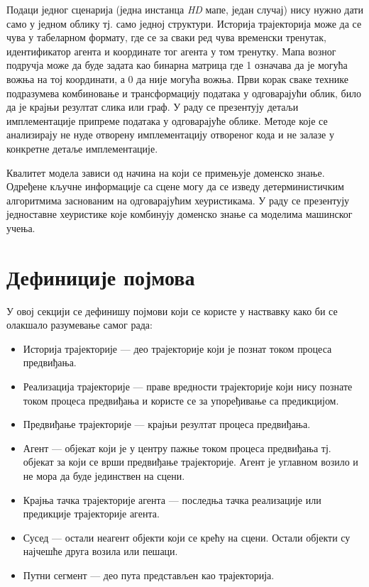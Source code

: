 \documentclass[11pt,oneside]{memoir}
\begin{document}
Подаци једног сценарија (једна инстанца \textit{HD} мапе, један случај) нису нужно дати само у једном облику 
тј. само једној структури. Историја
трајекторија може да се чува у табеларном формату, где се за сваки ред чува временски тренутак, идентификатор агента и координате
тог агента у том тренутку. Мапа возног подручја може да буде задата као бинарна матрица где 1 означава да је могућа вожња на тој координати, 
а 0 да није могућа вожња. Први корак
сваке технике подразумева комбиновање и трансформацију података у одговарајући облик, било да је крајњи резултат слика или граф. У раду
се презентују детаљи имплементације припреме података у одговарајуће облике. 
Методе које се анализирају не нуде отворену имплементацију отвореног кода и не залазе у конкретне детаље имплементације. 

Квалитет модела зависи од начина на који се примењује доменско знање. Одређене кључне информације
са сцене могу да се изведу детерминистичким алгоритмима заснованим на одговарајућим хеуристикама. У раду се презентују
једноставне хеуристике које комбинују доменско знање са моделима машинског учења.

\section{Дефиниције појмова}

У овој секцији се дефинишу појмови који се користе у наствавку како би се олакшало разумевање самог рада:
\begin{itemize}
  \item Историја трајекторије --- део трајекторије који је познат током процеса предвиђања.
  \item Реализација трајекторије --- праве вредности трајекторије који нису познате током процеса предвиђања и користе се за упоређивање са предикцијом.
  \item Предвиђање трајекторије --- крајњи резултат процеса предвиђања.
  \item Агент --- објекат који је у центру пажње током процеса предвиђања тј. објекат за који се врши предвиђање трајекторије. 
        Агент је углавном возило и не мора да буде јединствен на сцени.
  \item Крајња тачка трајекторије агента --- последња тачка реализације или предикције трајекторије агента.
  \item Сусед --- остали неагент објекти који се крећу на сцени. Остали објекти су најчешће друга возила или пешаци.
  \item Путни сегмент --- део пута представљен као трајекторија.
\end{itemize}
\end{document}
